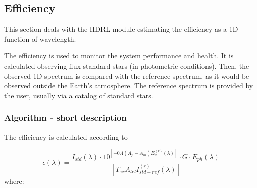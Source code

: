 \subsection{Efficiency}
\label{efficiency:main}

This section deals with the HDRL module estimating the efficiency as a 1D function of wavelength.

The efficiency is used to monitor the system performance and health. It is calculated observing flux standard stars (in photometric conditions). Then, the observed 1D spectrum is compared with the reference spectrum, as it would be observed outside the Earth's atmosphere. The reference spectrum is provided by the user, usually via a catalog of standard stars. 


\subsubsection{Algorithm - short description}
The efficiency is calculated according to 

\begin{equation}
\epsilon(\lambda)=  \frac{I_{std}(\lambda) \cdot 10^{[ -0.4(A_p- A_m)E_x^{(r)}(\lambda)] } \cdot G \cdot E_{ph}(\lambda)}{[ T_{ex} A_{tel} I_{std-ref}^{(r)}(\lambda) ]}
\label{eq:eff}
\end{equation}
where:

